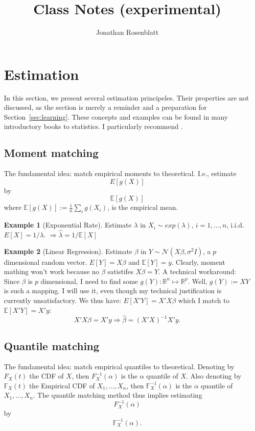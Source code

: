 \documentclass[12pt,a4paper]{article}
\author{Jonathan Rosenblatt}
\title{Class Notes (experimental)}
\theoremstyle{plain}
\theoremstyle{definition}
\newtheorem{example}{Example}
\newcommand{\expect}[1]{E\left[ #1 \right]}
\newcommand{\expectn}[1]{\mathbb{E}[#1]}
\newcommand{\gauss}[1]{\mathcal{N}(#1)}
\newcommand{\cdf}[2]{F_{#1}(#2)}
\newcommand{\cdfn}[2]{\mathbb{F}_{#1}(#2)}
\newcommand{\icdf}[2]{F^{-1}_{#1}(#2)}
\newcommand{\icdfn}[2]{\mathbb{F}^{-1}_{#1}(#2)}
\begin{document}
\maketitle

\tableofcontents

\section{Estimation}
\label{sec:estimation} 
In this section, we present several estimation principeles. 
Their properties are not discussed, as the section is merely a reminder and a preparation for Section~\ref{sec:learning}.
These concepts and examples can be found in many introductory books to statistics. I particularly recommend \citep{wasserman_all_2004}.

\subsection{Moment matching}
\label{sec:moment_matching}

The fundamental idea: match empirical moments to theoretical. I.e., estimate
$$ \expect{g(X)}   $$
by 
$$ \expectn{g(X)}   $$
where $\expectn{g(X)}:=\frac{1}{n}  \sum_i g(X_i)$, is the empirical mean.

\begin{example}[Exponential Rate]

Estimate $\lambda$ in $X_i \sim exp(\lambda)$, $i=1,\dots,n$, i.i.d.
$\expect{X}=1/\lambda$.
$\Rightarrow \hat{\lambda}=1/\expectn{X}$ 

\end{example}


\begin{example}[Linear Regression]

Estimate $\beta$ in $Y \sim \gauss{X\beta,\sigma^2 I}$, a $p$ dimensional random vector.
$\expect{Y}=X\beta$ and $\expectn{Y}=y$.
Clearly, moment mathing won't work because no $\beta$ satistifes $X\beta=Y$.
A technical workaround:
Since $\beta$ is $p$ dimensional, I need to find some $g(Y): \mathbb{R}^n \mapsto \mathbb{R}^p$.
Well, $g(Y):=XY$ is such a mapping. I will use it, even though my technical justification is currently unsatisfactory. We thus have:
$\expect{X'Y}=X'X\beta$ which I match to $\expectn{X'Y}=X'y$:
$$
  X'X \beta = X' y \Rightarrow \hat{\beta}=(X'X)^{-1} X'y.
$$

\end{example}


\subsection{Quantile matching}
\label{sec:quantiles}
The fundamental idea: match empirical quantiles to theoretical. 
Denoting by $\cdf{X}{t}$ the CDF of $X$, then $\icdf{X}{\alpha}$ is the $\alpha$ quantile of $X$.
Also denoting by $\cdfn{X}{t}$ the Empirical CDF of $X_1,\dots, X_n$, then $\icdfn{X}{\alpha}$ is the $\alpha$ quantile of $X_1,\dots, X_n$.
The quantile matching method thus implies estimating
$$ \icdf{X}{\alpha}   $$
by 
$$ \icdfn{X}{\alpha}  . $$
\end{document}
